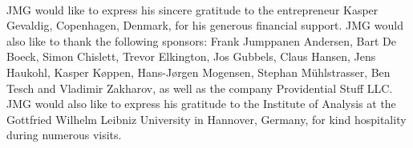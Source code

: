 \documentclass[letterpaper,12pt]{article}
\begin{document}
 

















\vspace{1cm}
\\


\noindent
JMG would like to express his sincere gratitude to the entrepreneur Kasper Gevaldig, Copenhagen, Denmark, for his generous financial support. JMG would also like to thank the following sponsors:  Frank Jumppanen Andersen, Bart De Boeck, Simon Chislett, Trevor Elkington, Jos Gubbels, Claus Hansen, Jens Haukohl, Kasper K\o ppen, Hans-J\o rgen Mogensen, Stephan M\"{u}hlstrasser, Ben Tesch and Vladimir Zakharov, as well as the company Providential Stuff LLC. JMG would also like to express his gratitude to the Institute of Analysis at the Gottfried Wilhelm Leibniz University in Hannover, Germany, for kind hospitality during numerous visits.
\end{document}
